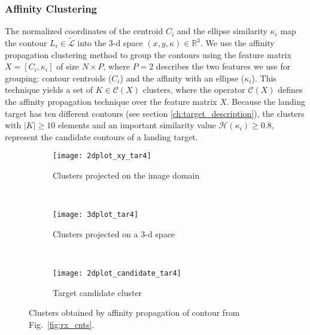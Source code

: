 \subsubsection{Affinity Clustering}\label{subsec:clustering}
The normalized coordinates of the centroid $C_i$ and the ellipse similarity $\kappa_i$ map the contour $L_i\in \widetilde{\mathcal{L}}$ into the 3-d space $(x, y, \kappa) \in \mathbb{R}^3$. We use the affinity propagation clustering method \citep{Frey.Dueck:SCIENCE:2017} to group the contours using the feature matrix $X=[C_{i}, \kappa_{i}]$ of size $N \times P$, where $P=2$ describes the two features we use for grouping: contour centroids ($C_i$) and the affinity with an ellipse ($\kappa_i$). This technique yields a set of $K \in \mathcal{C}(X)$ clusters, where the operator $\mathcal{C}(X)$ defines the affinity propagation technique over the feature matrix $X$. Because the landing target has ten different contours (see section \ref{ch:target_description}), the clusters with $|K|\geq 10$ elements and an important similarity value $\mathcal{H}(\kappa_{i})\geq 0.8$, represent the candidate contours of a landing target.

\begin{figure}[h]
    \centering
    \begin{subfigure}[b]{0.45\textwidth}
        \texttt{[image: 2dplot\_xy\_tar4]}
        \caption{Clusters projected on the image domain}
        \label{fig:2dplot}
    \end{subfigure}
    ~ %
    \begin{subfigure}[b]{0.45\textwidth}
        \texttt{[image: 3dplot\_tar4]}
        \caption{Clusters projected on a 3-d space}
        \label{fig:3dplot}
    \end{subfigure}
    ~ %
    \begin{subfigure}[b]{0.45\textwidth}
        \texttt{[image: 2dplot\_candidate\_tar4]}
        \caption{Target candidate cluster}
        \label{fig:candidate}
    \end{subfigure}
   \caption{Clusters obtained by affinity propagation of contour from Fig.\ \ref{fig:rx_cnts}.}\label{fig:grouping_process}
\end{figure}

